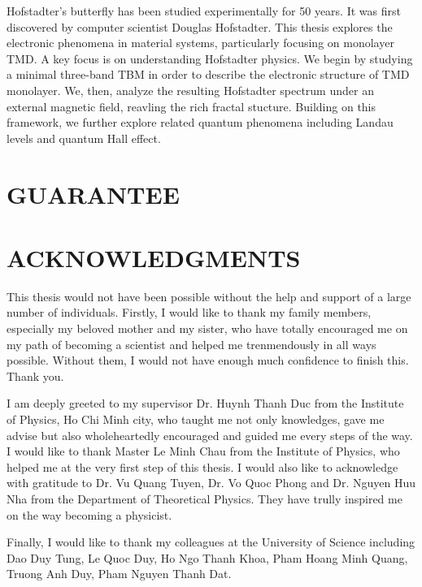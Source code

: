 \documentclass{report}
\begin{document}
Hofstadter's butterfly has been studied experimentally for 50 years. It was first discovered by computer scientist Douglas Hofstadter. This thesis explores the electronic phenomena in material systems, particularly focusing on monolayer \ac{TMD}. A key focus is on understanding Hofstadter physics. We begin by studying a minimal three-band \ac{TBM} in order to describe the electronic structure of \ac{TMD} monolayer. We, then, analyze the resulting Hofstadter spectrum under an external magnetic field, reavling the rich fractal stucture. Building on this framework, we further explore related quantum phenomena including Landau levels and quantum Hall effect.

\chapter*{GUARANTEE}


\chapter*{ACKNOWLEDGMENTS}
This thesis would not have been possible without the help and support of a large number of individuals. Firstly, I would like to thank my family members, especially my beloved mother and my sister, who have totally encouraged me on my path of becoming a scientist and helped me trenmendously in all ways possible. Without them, I would not have enough much confidence to finish this. Thank you.

I am deeply greeted to my supervisor Dr. Huynh Thanh Duc from the Institute of Physics, Ho Chi Minh city, who taught me not only knowledges, gave me advise but also wholeheartedly encouraged and guided me every steps of the way. I would like to thank Master Le Minh Chau from the Institute of Physics, who helped me at the very first step of this thesis. I would also like to acknowledge with gratitude to Dr. Vu Quang Tuyen, Dr. Vo Quoc Phong and Dr. Nguyen Huu Nha from the Department of Theoretical Physics. They have trully inspired me on the way becoming a physicist. 

Finally, I would like to thank my colleagues at the University of Science including Dao Duy Tung, Le Quoc Duy, Ho Ngo Thanh Khoa, Pham Hoang Minh Quang, Truong Anh Duy, Pham Nguyen Thanh Dat.
\renewcommand{\contentsname}{TABLE OF CONTENTS}
\tableofcontents
\renewcommand{\listfigurename}{LIST OF FIGURES}
\listoffigures
\newpage
\renewcommand{\listtablename}{LIST OF TABLES}
\listoftables
\newpage
\end{document}

